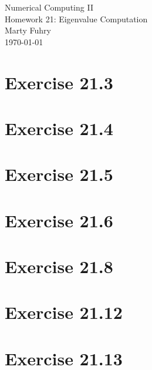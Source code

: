 \documentclass[11pt]{article}
\begin{document}
         
\newcommand{\makehomework}[2]%
{\begin{center}%
	\Huge #1\\%
	\Large #2\\%
	Marty Fuhry\\%
	\today%
\end{center}}
\makehomework{Numerical Computing II}{Homework 21: Eigenvalue Computation}

\section*{Exercise 21.3}



\section*{Exercise 21.4}
\section*{Exercise 21.5}
\section*{Exercise 21.6}
\section*{Exercise 21.8}
\section*{Exercise 21.12}
\section*{Exercise 21.13}
%


\end{document}
